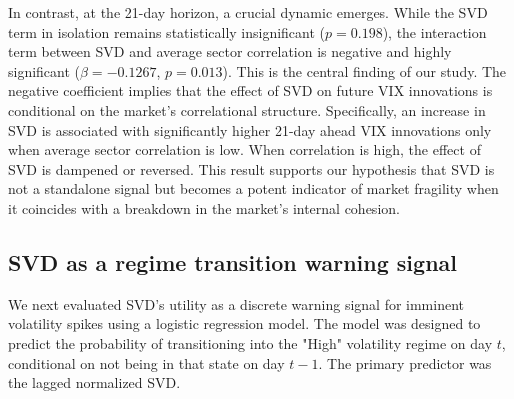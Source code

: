 \documentclass[]{article}
\begin{document}
\begin{table}[htbp]
\centering
\caption{OLS Regression of Future VIX Log-Returns}
\label{tab:ols_results}
\end{table}

In contrast, at the 21-day horizon, a crucial dynamic emerges. While the SVD term in isolation remains statistically insignificant ($p = 0.198$), the interaction term between SVD and average sector correlation is negative and highly significant ($\beta = -0.1267$, $p = 0.013$). This is the central finding of our study. The negative coefficient implies that the effect of SVD on future VIX innovations is conditional on the market's correlational structure. Specifically, an increase in SVD is associated with significantly higher 21-day ahead VIX innovations only when average sector correlation is low. When correlation is high, the effect of SVD is dampened or reversed. This result supports our hypothesis that SVD is not a standalone signal but becomes a potent indicator of market fragility when it coincides with a breakdown in the market's internal cohesion.

\subsection{SVD as a regime transition warning signal}
We next evaluated SVD's utility as a discrete warning signal for imminent volatility spikes using a logistic regression model. The model was designed to predict the probability of transitioning into the "High" volatility regime on day $t$, conditional on not being in that state on day $t-1$. The primary predictor was the lagged normalized SVD.
\end{document}
